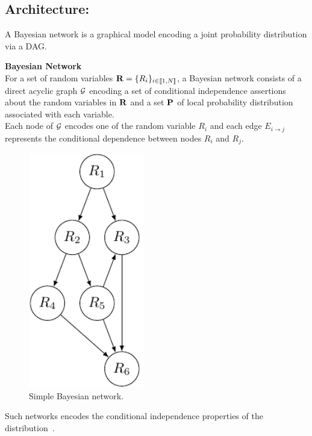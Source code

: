 \documentclass[a4paper,11pt]{report}
\begin{document}
    \subsection{Architecture:}
      \label{subsec:PGMs/BN/Architecture}
      
      A Bayesian network is a graphical model encoding a joint probability distribution via a DAG.
      
      \begin{defn} \textbf{Bayesian Network}\\
				For a set of random variables ${\bf R} = \{R_{i}\}_{i \in \llbracket1,N \rrbracket}$, a Bayesian network consists of a direct acyclic graph $\mathcal{G}$ encoding a set of conditional independence assertions about the random variables in ${\bf R}$ and  a set ${\bf P}$ of local probability distribution associated with each variable.\\
				Each node of $\mathcal{G}$ encodes one of the random variable $R_{i}$ and each edge $E_{i \rightarrow j}$ represents the conditional dependence between nodes $R_{i}$ and $R_{j}$.
				\label{def:BN}
      \end{defn}
     
			\begin{figure}[h]
				\begin{center}
					\includegraphics[width=2in]{bn_simple_crop.pdf}
					\caption{Simple Bayesian network.} 
					\label{fig:Eg BN}
				\end{center}
			\end{figure}

			Such networks encodes the conditional independence properties of the distribution~\citep{nilsson1998artificial}.
			
\end{document}
